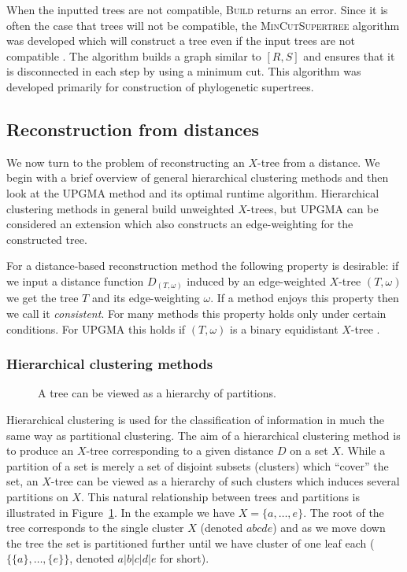 When the inputted trees are not compatible, \textsc{Build} returns an error.
Since it is often the case that trees will not be compatible, the
\textsc{MinCutSupertree} algorithm was developed which will construct a tree
even if the input trees are not compatible \cite{semple2000supertree}.
The algorithm builds a graph similar to $[R,S]$ and ensures that it is
disconnected in each step by using a minimum cut.  This algorithm was
developed primarily for construction of phylogenetic supertrees.

\subsection{Reconstruction from distances}
\label{sec:constr-from-dist}

We now turn to the problem of reconstructing an $X$-tree from a distance.  We
begin with a brief overview of general hierarchical clustering methods and
then look at the UPGMA method \cite{sokal1958statistical} and its optimal
runtime algorithm.  Hierarchical clustering methods in general build
unweighted $X$-trees, but UPGMA can be considered an extension which also
constructs an edge-weighting for the constructed tree.

For a distance-based reconstruction method the following property is
desirable: if we input a distance function $D_{(T,\omega)}$ induced by an
edge-weighted $X$-tree $(T,\omega)$ we get the tree $T$ and its edge-weighting
$\omega$.  If a method enjoys this property then we call it
\textit{consistent}.  For many methods this property holds only under certain
conditions.  For UPGMA this holds if $(T,\omega)$ is a binary equidistant
$X$-tree \cite{durbin1998biological}.

\subsubsection{Hierarchical clustering methods}
\label{sec:hier-clust-meth}

\begin{figure}
  \centering
  
  \caption{A tree can be viewed as a hierarchy of partitions.}
  \label{fig:tree-clust-ex}
\end{figure}

Hierarchical clustering is used for the classification of information in much
the same way as partitional clustering.  The aim of a hierarchical clustering
method is to produce an $X$-tree corresponding to a given distance $D$ on a
set $X$.  While a partition of a set is merely a set of disjoint subsets
(clusters) which ``cover'' the set, an $X$-tree can be viewed as a hierarchy
of such clusters which induces several partitions on $X$.  This natural
relationship between trees and partitions is illustrated in
Figure~\ref{fig:tree-clust-ex}.  In the example we have $X = \{a,\dotsc,e\}$.
The root of the tree corresponds to the single cluster $X$ (denoted $abcde$)
and as we move down the tree the set is partitioned further until we have
cluster of one leaf each ($\{\{a\},\dotsc,\{e\}\}$, denoted $a|b|c|d|e$ for
short).

